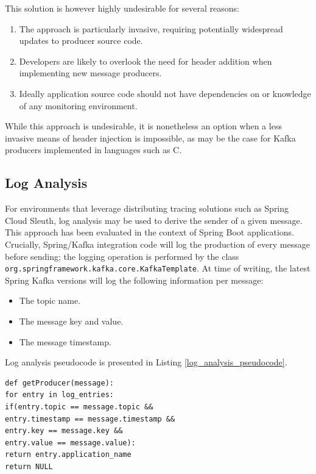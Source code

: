 This solution is however highly undesirable for several reasons:

\begin{enumerate}
	\item The approach is particularly invasive, requiring potentially widespread updates to producer source code. 
	\item Developers are likely to overlook the need for header addition when implementing new message producers.
	\item Ideally application source code should not have dependencies on or knowledge of any monitoring environment. 
\end{enumerate}

While this approach is undesirable, it is nonetheless an option when a less invasive means of header injection is impossible, as may be the case for Kafka producers implemented in languages such as C.

\subsection{Log Analysis}

For environments that leverage distributing tracing solutions such as Spring Cloud Sleuth, log analysis may be used to derive the sender of a given message. This approach has been evaluated in the context of Spring Boot applications. Crucially, Spring/Kafka integration code will log the production of every message before sending; the logging operation is performed by the class \texttt{org.springframework.kafka.core.KafkaTemplate}. At time of writing, the latest Spring Kafka versions will log the following information per message:

\begin{itemize}
	\item The topic name.
	\item The message key and value.
	\item The message timestamp.
\end{itemize}

Log analysis pseudocode is presented in Listing \ref{log_analysis_pseudocode}.

\begin{lstlisting}[caption={Log analysis pseudocode},captionpos=b,label={log_analysis_pseudocode}]
def getProducer(message):
for entry in log_entries:
if(entry.topic == message.topic &&
entry.timestamp == message.timestamp &&
entry.key == message.key &&
entry.value == message.value):
return entry.application_name
return NULL
\end{lstlisting}

